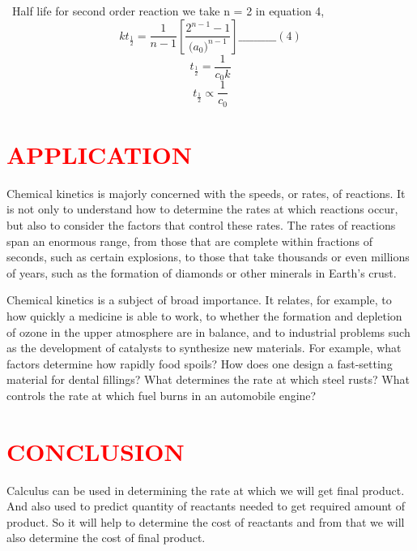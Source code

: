 \documentclass[12pt]{article}
\begin{document}
\ Half life for second order reaction we take n = 2 in equation 4,
\\ $$kt_\frac{1}{2} = \frac{1}{n-1}[\frac{{2}^{n-1}-1}{({a_0)}^{n-1}}]\_\_\_\_\_\_\_\_\_\_(4)$$
$$t_\frac{1}{2} = \frac{1}{c_0k}$$
$$t_\frac{1}{2} \propto \frac{1}{c_0}$$
\section{\textcolor{red}{APPLICATION}}

Chemical kinetics is majorly concerned with the speeds, or rates, of reactions. It is not only to understand how to determine the rates at which reactions occur, but also to consider the factors that control these rates. The rates of reactions span an enormous range, from those that are complete within fractions of seconds, such as certain explosions, to those that take thousands or even millions of years, such as the formation of diamonds or other minerals in Earth’s crust. 

Chemical kinetics is a subject of broad importance. It relates, for example, to how quickly a medicine is able to work, to whether the formation and depletion of ozone in the upper atmosphere are in balance, and to industrial problems such as the development of catalysts to synthesize new materials. For example, what factors determine how rapidly food spoils? How does one design a fast-setting material for dental fillings? What determines the rate at which steel rusts? What controls the rate at which fuel burns in an automobile engine? 


\section{\textcolor{red}{CONCLUSION}} 

Calculus can be used in determining the rate at which we will get final product. And also used to predict quantity of reactants needed to get required amount of product. So it will help to determine the cost of reactants and from that we will also determine the cost of final product.
         
\newpage

\cite{*}




\fontsize{50}{50}\selectfont{THANK  YOU ....}
\end{document}
